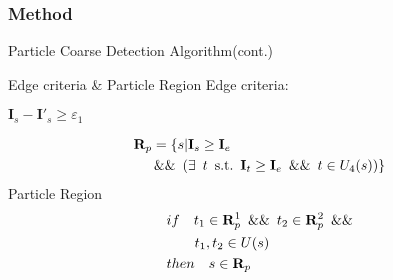 \documentclass[14pt,hyperref={CJKbookmarks=true}]{beamer}
\theoremstyle{plain}
\theoremstyle{definition}
\theoremstyle{remark}
\begin{document}
\begin{frame}
\frametitle{Method}{Particle Coarse Detection Algorithm(cont.)}
\small
\begin{block} {Edge criteria \& Particle Region}
Edge criteria:
\begin{center}
$\mathbf{I}_s - \mathbf{I}'_s \geq \varepsilon_1$
\end{center}
\begin{equation}\label{pixelclass}
\begin{split}
  \mathbf{R}_p = \{s| &\mathbf{I}_s\geq\mathbf{I}_e \enskip  \\
  \&\& \enskip ( & \exists \enskip t \enskip \text{s.t.} \enskip \mathbf{I}_t\geq\mathbf{I}_e \enskip \&\& \enskip t\in U_4(s))\}
\end{split}
\end{equation}
Particle Region
\begin{equation}\label{eq:cluster_criterion}
\begin{split}
&if \quad t_1\in \mathbf{R}^1_p\enskip \&\&  \enskip t_2\in \mathbf{R}^2_p\enskip \&\& \\ &\enskip \enskip \quad t_1,t_2\in U(s) \\
  &then  \quad s \in \mathbf{R}_p
\end{split}
\end{equation}
\end{block}
\end{frame}
\end{document}
